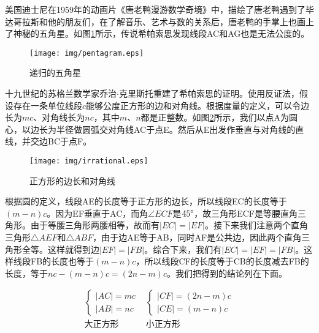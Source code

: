 \documentclass{article}
\begin{document}
美国迪士尼在1959年的动画片《唐老鸭漫游数学奇境》中，描绘了唐老鸭遇到了毕达哥拉斯和他的朋友们，在了解音乐、艺术与数的关系后，唐老鸭的手掌上也画上了神秘的五角星。如图\ref{fig:pentagram}所示，传说希帕索思发现线段AC和AG也是无法公度的。


\begin{figure}[htbp]
 \centering
 \texttt{[image: img/pentagram.eps]}
 \caption{递归的五角星}
 \label{fig:pentagram}
\end{figure}

十九世纪的苏格兰数学家乔治$\cdot$克里斯托重建了希帕索思的证明。使用反证法，假设存在一条单位线段$c$能够公度正方形的边和对角线。根据度量的定义，可以令边长为$mc$、对角线长为$nc$，其中$m$、$n$都是正整数。如图\ref{fig:irrational}所示，我们以点A为圆心，以边长为半径做圆弧交对角线AC于点E。然后从E出发作垂直与对角线的直线，并交边BC于点F。

\begin{figure}[htbp]
 \centering
 \texttt{[image: img/irrational.eps]}
 \caption{正方形的边长和对角线}
 \label{fig:irrational}
\end{figure}

根据圆的定义，线段AE的长度等于正方形的边长，所以线段EC的长度等于$(m - n)c$。因为EF垂直于AC，而角$\angle ECF$是$45\degree$，故三角形ECF是等腰直角三角形。由于等腰三角形两腰相等，故而有$|EC| = |EF|$。接下来我们注意两个直角三角形$\triangle AEF$和$\triangle ABF$，由于边AE等于AB，同时AF是公共边，因此两个直角三角形全等。这样就得到边$|EF| = |FB|$。综合下来，我们有$|EC| = |EF| = |FB|$。这样线段FB的长度也等于$(m - n)c$，所以线段CF的长度等于CB的长度减去FB的长度，等于$nc - (m - n)c = (2n - m)c$。我们把得到的结论列在下面。

\[
\begin{array}{c|c}
\begin{cases}
|AC| = mc \\
|AB| = nc
\end{cases} &
\begin{cases}
|CF| = (2n - m)c \\
|CE| = (m - n)c
\end{cases} \\[4ex]
\text{大正方形} & \text{小正方形}
\end{array}
\]
\end{document}
